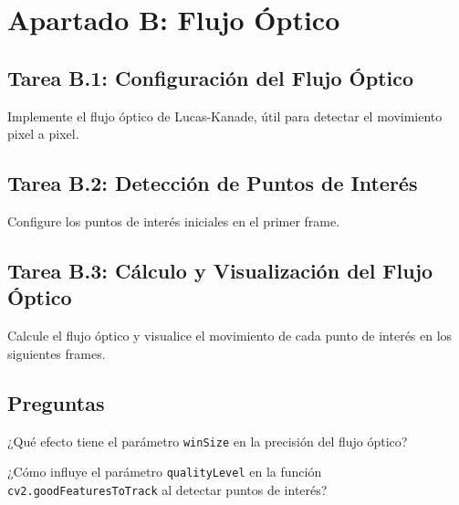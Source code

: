 \chapter{Apartado B: \textbf{Flujo Óptico}}
\label{chapter:tarea_b}

\section*{Tarea B.1: Configuración del Flujo Óptico}
{}
Implemente el flujo óptico de Lucas-Kanade, útil para detectar el movimiento pixel a pixel.

\section*{Tarea B.2: Detección de Puntos de Interés}
{}
Configure los puntos de interés iniciales en el primer frame.

\section*{Tarea B.3: Cálculo y Visualización del Flujo Óptico}
{}
Calcule el flujo óptico y visualice el movimiento de cada punto de interés en los siguientes frames.

\section*{Preguntas}

\vspace{5mm}
\begin{tcolorbox}[colback=gray!10, colframe=gray!30, coltitle=black, title=Pregunta B.1, halign=left]
¿Qué efecto tiene el parámetro \texttt{winSize} en la precisión del flujo óptico?
\end{tcolorbox}


\vspace{5mm}
\begin{tcolorbox}[colback=gray!10, colframe=gray!30, coltitle=black, title=Pregunta B.2, halign=left]
¿Cómo influye el parámetro \texttt{qualityLevel} en la función \texttt{cv2.goodFeaturesToTrack} al detectar puntos de interés?
\end{tcolorbox}